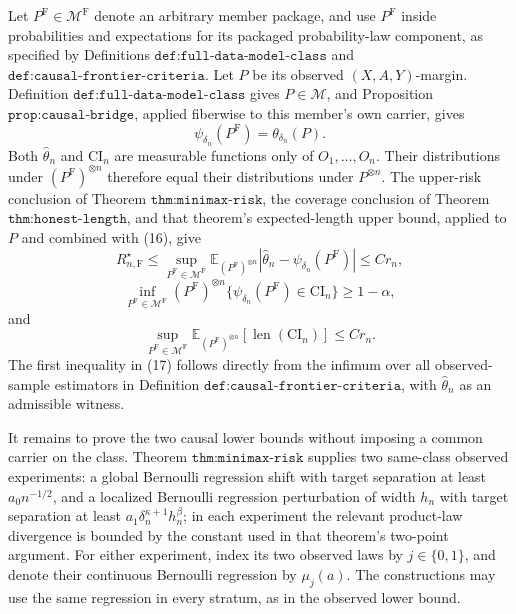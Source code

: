 Let \(P^{\mathrm F}\in\mathcal M^{\mathrm F}\) denote an arbitrary member package, and use \(P^{\mathrm F}\) inside probabilities and expectations for its packaged probability-law component, as specified by Definitions \(\texttt{def:full-data-model-class}\) and \(\texttt{def:causal-frontier-criteria}\). Let \(P\) be its observed \((X,A,Y)\)-margin. Definition \(\texttt{def:full-data-model-class}\) gives \(P\in\mathcal M\), and Proposition \(\texttt{prop:causal-bridge}\), applied fiberwise to this member's own carrier, gives
\[
 \psi_{\delta_n}(P^{\mathrm F})=\theta_{\delta_n}(P).
\tag{16}
\]
Both \(\widehat\theta_n\) and \(\mathrm{CI}_n\) are measurable functions only of \(O_1,\ldots,O_n\). Their distributions under \((P^{\mathrm F})^{\otimes n}\) therefore equal their distributions under \(P^{\otimes n}\). The upper-risk conclusion of Theorem \(\texttt{thm:minimax-risk}\), the coverage conclusion of Theorem \(\texttt{thm:honest-length}\), and that theorem's expected-length upper bound, applied to \(P\) and combined with (16), give
\[
 R_{n,\mathrm F}^\star
 \leq\sup_{P^{\mathrm F}\in\mathcal M^{\mathrm F}}
 \mathbb E_{(P^{\mathrm F})^{\otimes n}}
 |\widehat\theta_n-\psi_{\delta_n}(P^{\mathrm F})|
 \leq Cr_n,
\tag{17}
\]
\[
 \inf_{P^{\mathrm F}\in\mathcal M^{\mathrm F}}(P^{\mathrm F})^{\otimes n}
 \{\psi_{\delta_n}(P^{\mathrm F})\in\mathrm{CI}_n\}\geq1-\alpha,
\tag{18}
\]
and
\[
 \sup_{P^{\mathrm F}\in\mathcal M^{\mathrm F}}
 \mathbb E_{(P^{\mathrm F})^{\otimes n}}[\operatorname{len}(\mathrm{CI}_n)]
 \leq Cr_n.
\tag{19}
\]
The first inequality in (17) follows directly from the infimum over all observed-sample estimators in Definition \(\texttt{def:causal-frontier-criteria}\), with \(\widehat\theta_n\) as an admissible witness.

It remains to prove the two causal lower bounds without imposing a common carrier on the class. Theorem \(\texttt{thm:minimax-risk}\) supplies two same-class observed experiments: a global Bernoulli regression shift with target separation at least \(a_0n^{-1/2}\), and a localized Bernoulli regression perturbation of width \(h_n\) with target separation at least \(a_1\delta_n^{\kappa+1}h_n^\beta\); in each experiment the relevant product-law divergence is bounded by the constant used in that theorem's two-point argument. For either experiment, index its two observed laws by \(j\in\{0,1\}\), and denote their continuous Bernoulli regression by \(\mu_j(a)\). The constructions may use the same regression in every stratum, as in the observed lower bound.

